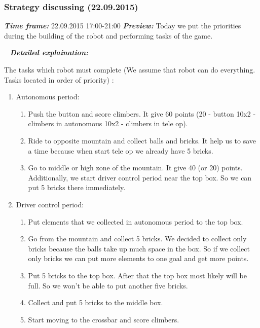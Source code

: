 \addtocounter{number_of_meeting}{1}
\subsubsection{Strategy discussing (22.09.2015)}
	\textit{\textbf{Time frame:}} 22.09.2015 17:00-21:00 \newline
	\textit{\textbf{Preview:}} Today we put the priorities during the building of the robot and performing tasks of the game.\newline \newline
  
   \newline
  \textit{\textbf{Detailed explaination:}}
  \begin{enumerate*}
  	\item The tasks which robot must complete (We assume that robot can do everything. Tasks located in order of priority) :
  	\begin{enumerate}
  		\item Autonomous period:
  		\begin{enumerate}
  			\item Push the button and score climbers. It give 60 points (20 - button 10x2 - climbers in autonomous 10x2 - climbers in tele op).
  			\item Ride to opposite mountain and collect balls and bricks. It help us to save a time because when start tele op we already have 5 bricks. 
  			\item Go to middle or high zone of the mountain. It give 40 (or 20) points. Additionally, we start driver control period near the top box. So we can put 5 bricks there immediately.
  		\end{enumerate}
  		\item Driver control period:
  		\begin{enumerate}
	  		\item Put elements that we collected in autonomous period to the top box.
	  		\item Go from the mountain and collect 5 bricks. We decided to collect only bricks because the balls take up much space in the box. So if we collect only bricks we can put more elements to one goal and get more points.
	  		\item Put 5 bricks to the top box. After that the top box most likely will be full. So we won't be able to put another five bricks.
	  		\item Collect and put 5 bricks to the middle box.
	  		\item Start moving to the crossbar and score climbers.

\end{enumerate}
\end{enumerate}
\end{enumerate*}
